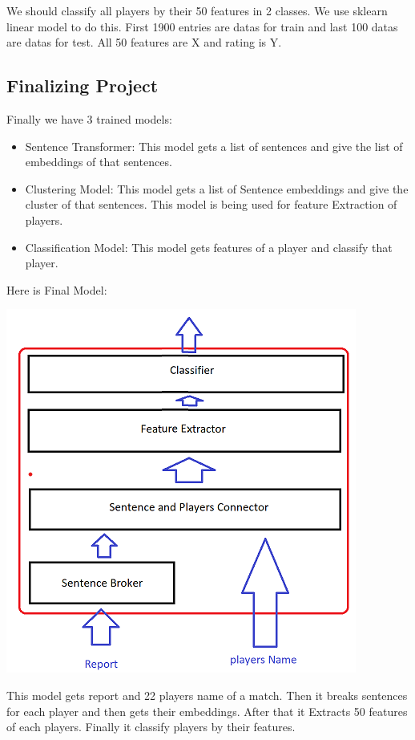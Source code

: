 \documentclass{article}
\begin{document}
We should classify all players by their 50 features in 2 classes. We use sklearn linear model to do this. First 1900 entries are datas for train and last 100 datas are datas for test. 
All 50 features are X and rating is Y.

\subsection{Finalizing Project}
Finally we have 3 trained models:
\begin{itemize}
    \item Sentence Transformer: This model gets a list of sentences and give the list of embeddings of that sentences.
    \item Clustering Model: This model gets a list of Sentence embeddings and give the cluster of that sentences. This model is being used for feature Extraction of players.
    \item Classification Model: This model gets features of a player and classify that player.
\end{itemize}

Here is Final Model:
\begin{center}
    \includegraphics{FinalModel.png}
\end{center}

This model gets report and 22 players name of a match. Then it breaks sentences for each player and then gets their embeddings. After that it Extracts 50 features of each players.
Finally it classify players by their features.
\end{document}
